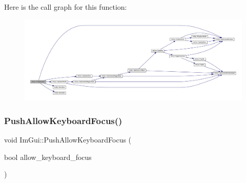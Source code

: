 Here is the call graph for this function\+:
\nopagebreak
\begin{figure}[H]
\begin{center}
\leavevmode
\includegraphics[width=350pt]{namespace_im_gui_a83349d38c7c73f92ae977bc5b530a9e9_cgraph}
\end{center}
\end{figure}
\mbox{\label{namespace_im_gui_adf7c3cfdcbb06617bb70ff1526d064f4}} 
\subsubsection{\texorpdfstring{Push\+Allow\+Keyboard\+Focus()}{PushAllowKeyboardFocus()}}
{\footnotesize\ttfamily void Im\+Gui\+::\+Push\+Allow\+Keyboard\+Focus (\begin{DoxyParamCaption}\item[{bool}]{allow\+\_\+keyboard\+\_\+focus }\end{DoxyParamCaption})}

